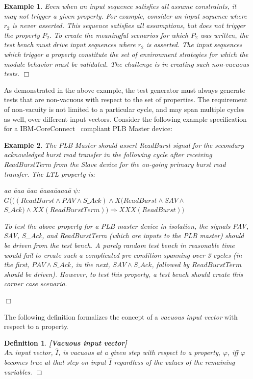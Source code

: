 \documentclass[a4paper, 11pt]{article}
\newtheorem{example}{Example} %
\newtheorem{definition}{Definition} %
\begin{document}
\begin{example}
{Even when an input sequence satisfies all assume constraints, it may
not {\em trigger} a given property. For example, consider an input
sequence where $r_2$ is never asserted. This sequence satisfies
all assumptions, but does not trigger the property $P_2$.
To create the meaningful scenarios for which $P_2$ was
written, the test bench must drive input sequences where $r_2$
is asserted. The input sequences which trigger a property constitute the set 
of environment strategies for which the module behavior must be validated. 
The challenge is in creating such non-vacuous tests.
}$\Box$
\end{example}

\noindent
As demonstrated in the above example, the test generator must always
generate tests that are non-vacuous with respect to the set of properties.
The requirement of non-vacuity is not limited to a particular cycle, and
may span multiple cycles as well, over different input vectors.
Consider the following example specification for a IBM-CoreConnect~\cite{ibm}
compliant PLB Master device:

\begin{example}
{\em The PLB Master should assert ReadBurst signal for the
secondary acknowledged burst read transfer in the
following cycle after receiving ReadBurstTerm from the Slave device for the
on-going primary burst read transfer. The LTL property is:
{
\begin{tabbing}
aa \= aaa \= aaa \= aaaa\= aaaaa\= \kill
$\psi$: $G(((ReadBurst \land PAV \land S\_Ack) \land X(ReadBurst \land SAV \land$ \\
\>\> $S\_Ack) \land XX (ReadBurstTerm)) \Rightarrow XXX(ReadBurst))$
\end{tabbing}
}
\noindent
To test the above property for a PLB master device in isolation, the signals
PAV, SAV, S\_Ack, and ReadBurstTerm (which are inputs to the PLB master)
should be driven from the test bench. A purely random test bench in reasonable
time would fail to create such a complicated pre-condition spanning over 3
cycles (in the first, $PAV \land S\_Ack$, in the next,
$SAV \land S\_Ack$, followed by
$ReadBurstTerm$ should be driven). However, to test this property,
a test bench should create this corner case scenario.
}$\Box$
\end{example}

\noindent 
The following definition formalizes the concept of a {\em vacuous input 
vector} with respect to a property.
\begin{definition} {\bf [Vacuous input vector]}\\
{\em 
An input vector, $\widehat{I}$, is vacuous at a given step with respect to a
property, $\varphi$, iff $\varphi$ becomes true at that step on input
$\widehat{I}$ regardless of the values of the remaining variables. $\Box$
}
\end{definition}
\end{document}
